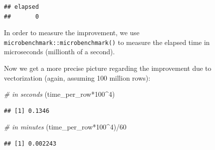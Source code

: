 \documentclass[
  12pt,
]{style/krantz}
\newenvironment{Shaded}{\begin{snugshade}}{\end{snugshade}}
\newcommand{\CommentTok}[1]{\textcolor[rgb]{0.56,0.35,0.01}{\textit{#1}}}
\newcommand{\DecValTok}[1]{\textcolor[rgb]{0.00,0.00,0.81}{#1}}
\newcommand{\FunctionTok}[1]{\textcolor[rgb]{0.00,0.00,0.00}{#1}}
\newcommand{\NormalTok}[1]{#1}
\newcommand{\OtherTok}[1]{\textcolor[rgb]{0.56,0.35,0.01}{#1}}
\newcommand{\SpecialCharTok}[1]{\textcolor[rgb]{0.00,0.00,0.00}{#1}}
\begin{document}
\begin{verbatim}
## elapsed 
##       0
\end{verbatim}

In order to measure the improvement, we use \texttt{microbenchmark::microbenchmark()} to measure the elapsed time in microseconds (millionth of a second).

\begin{Shaded}
\end{Shaded}

Now we get a more precise picture regarding the improvement due to vectorization (again, assuming 100 million rows):

\begin{Shaded}
\begin{Highlighting}[]
\CommentTok{\# in seconds}
\NormalTok{(time\_per\_row}\SpecialCharTok{*}\DecValTok{100}\SpecialCharTok{\^{}}\DecValTok{4}\NormalTok{) }
\end{Highlighting}
\end{Shaded}

\begin{verbatim}
## [1] 0.1346
\end{verbatim}

\begin{Shaded}
\begin{Highlighting}[]
\CommentTok{\# in minutes}
\NormalTok{(time\_per\_row}\SpecialCharTok{*}\DecValTok{100}\SpecialCharTok{\^{}}\DecValTok{4}\NormalTok{)}\SpecialCharTok{/}\DecValTok{60} 
\end{Highlighting}
\end{Shaded}

\begin{verbatim}
## [1] 0.002243
\end{verbatim}
\end{document}
